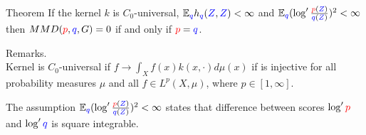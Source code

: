 \begin{frame}
\begin{columns}
\begin{column}{.33\linewidth}
\begin{block}{Theorem}
\large
If the kernel $k$ is $C_0$-universal, $\mathbb{E}_{{ \color{blue} { \color{blue} q}}} h_{{ \color{blue} { \color{blue} q}}}({ \color{blue} Z},{ \color{blue} Z})<\infty$ and $\mathbb{E}_{{ \color{blue} { \color{blue} q}}} (\log' \frac{{\color{red} p}({ \color{blue} Z})}{{ \color{blue} q}({ \color{blue} Z})})^{2}<\infty$
then $MMD({\color{red} p},{ \color{blue} q},G) =0$ if and only if ${\color{red} p}={ \color{blue} q}$.

\vspace{1cm}
\normalsize
Remarks.\\
Kernel is $C_0$-universal if  $f \to \int_X f(x) k(x,\cdot) d\mu(x)$ if is injective for all probability measures $\mu$ and all  $f \in L^p(X,\mu)$, where  $p \in [1,\infty] $. 
\vspace{0.5cm}

The assumption $\mathbb{E}_{{ \color{blue} q}} (\log' \frac{{\color{red} p}({ \color{blue} Z})}{{ \color{blue} q}({ \color{blue} Z})})^{2}<\infty$ states that difference between scores $\log' \color{red} p$ and $\log' \color{blue} q$  is square integrable.
\end{block}


\end{column}
\end{columns}
\end{frame}
